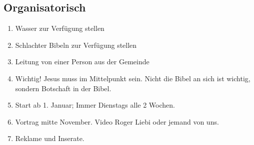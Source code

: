 \documentclass{../inc/mybib}
\begin{document}
    \subsection{Organisatorisch}
    \begin{enumerate}
        \item Wasser zur Verfügung stellen
        \item Schlachter Bibeln zur Verfügung stellen
        \item Leitung von einer Person aus der Gemeinde
        \item Wichtig! Jesus muss im Mittelpunkt sein. Nicht die Bibel an sich ist wichtig, sondern Botschaft in der Bibel.
        \item Start ab 1. Januar; Immer Dienstags alle 2 Wochen.
        \item Vortrag mitte November. Video Roger Liebi oder jemand von uns.
        \item Reklame und Inserate.
    \end{enumerate}
     
    
\end{document}

